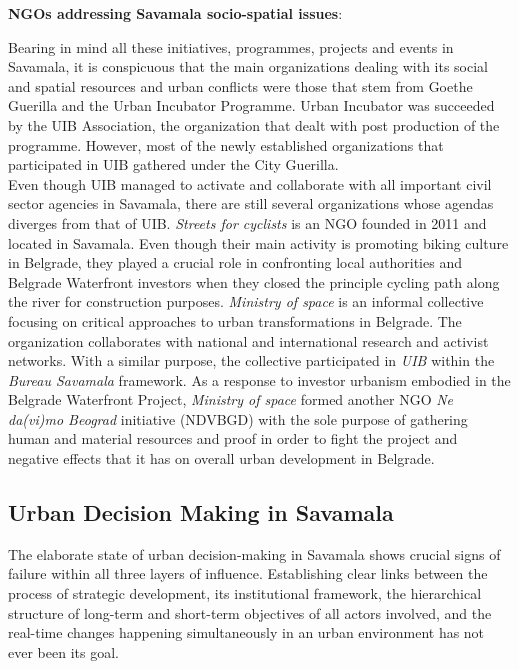 \documentclass[11pt]{report}
\begin{document}
{{{{\textbf{NGOs addressing Savamala socio-spatial issues}:

Bearing in mind all these initiatives, programmes, projects and events in Savamala, it is conspicuous that the main organizations dealing with its social and spatial resources and urban conflicts were those that stem from Goethe Guerilla and the Urban Incubator Programme. Urban Incubator was succeeded by the UIB Association, the organization that dealt with post production of the programme. However, most of the newly established organizations that participated in UIB gathered under the City Guerilla.
\\

Even though UIB managed to activate and collaborate with all important civil sector agencies in Savamala, there are still several organizations whose agendas diverges from that of UIB.
\textit{Streets for cyclists} is an NGO founded in 2011 and located in Savamala.
Even though their main activity is promoting biking culture in Belgrade, they played a crucial role in confronting local authorities and Belgrade Waterfront investors when they closed the principle cycling path along the river for construction purposes. 
\textit{Ministry of space} is an informal collective focusing on critical approaches to urban transformations in Belgrade.
The organization collaborates with national and international research and activist networks.  With a similar purpose, the collective participated in \textit{UIB} within the \textit{Bureau Savamala} framework.
As a response to investor urbanism embodied in the Belgrade Waterfront Project, \textit{Ministry of space} formed another NGO \textit{Ne da(vi)mo Beograd} initiative (NDVBGD) with the sole purpose of gathering human and material resources and proof in order to fight the project and negative effects that it has on overall urban development in Belgrade.

\subsection{Urban Decision Making in Savamala}

The elaborate state of urban decision-making in Savamala shows  crucial signs of failure within all three layers of influence. Establishing clear links between the process of strategic development, its institutional framework, the hierarchical structure of long-term and short-term objectives of all actors involved, and the real-time changes happening simultaneously in an urban environment has not ever been its goal.
\\

}}}}
\end{document}
